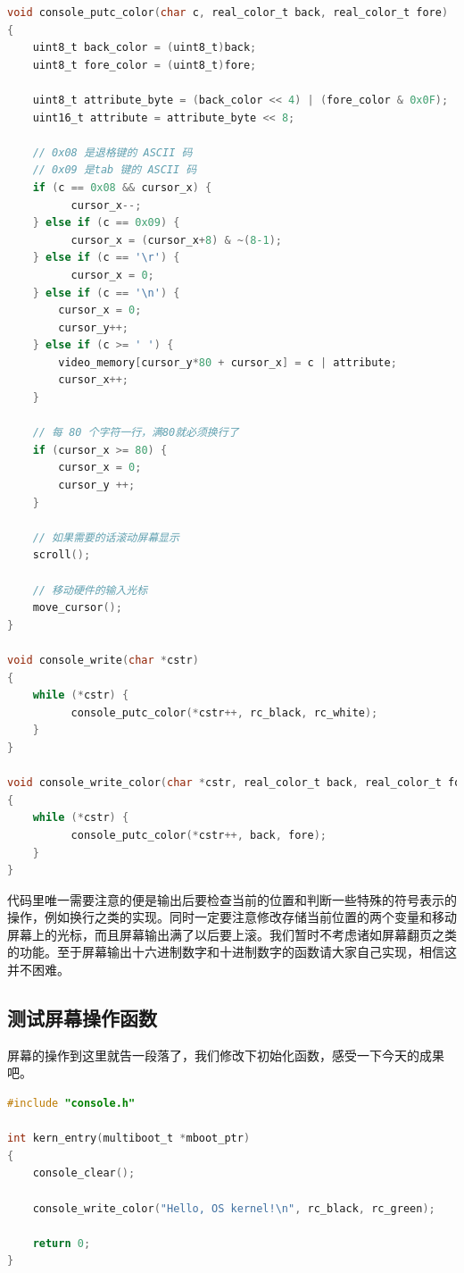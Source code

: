 \begin{lstlisting}[language = C, caption = drivers/console.c]
void console_putc_color(char c, real_color_t back, real_color_t fore)
{
	uint8_t back_color = (uint8_t)back;
	uint8_t fore_color = (uint8_t)fore;

	uint8_t attribute_byte = (back_color << 4) | (fore_color & 0x0F);
	uint16_t attribute = attribute_byte << 8;

	// 0x08 是退格键的 ASCII 码
	// 0x09 是tab 键的 ASCII 码
	if (c == 0x08 && cursor_x) {
	      cursor_x--;
	} else if (c == 0x09) {
	      cursor_x = (cursor_x+8) & ~(8-1);
	} else if (c == '\r') {
	      cursor_x = 0;
	} else if (c == '\n') {
		cursor_x = 0;
		cursor_y++;
	} else if (c >= ' ') {
		video_memory[cursor_y*80 + cursor_x] = c | attribute;
		cursor_x++;
	}

	// 每 80 个字符一行，满80就必须换行了
	if (cursor_x >= 80) {
		cursor_x = 0;
		cursor_y ++;
	}

	// 如果需要的话滚动屏幕显示
	scroll();

	// 移动硬件的输入光标
	move_cursor();
}

void console_write(char *cstr)
{
	while (*cstr) {
	      console_putc_color(*cstr++, rc_black, rc_white);
	}
}

void console_write_color(char *cstr, real_color_t back, real_color_t fore)
{
	while (*cstr) {
	      console_putc_color(*cstr++, back, fore);
	}
}
\end{lstlisting}

\par 代码里唯一需要注意的便是输出后要检查当前的位置和判断一些特殊的符号表示的操作，例如换行之类的实现。同时一定要注意修改存储当前位置的两个变量和移动屏幕上的光标，而且屏幕输出满了以后要上滚。我们暂时不考虑诸如屏幕翻页之类的功能。至于屏幕输出十六进制数字和十进制数字的函数请大家自己实现，相信这并不困难。

\subsection{测试屏幕操作函数}

\par 屏幕的操作到这里就告一段落了，我们修改下初始化函数，感受一下今天的成果吧。

\begin{lstlisting}[language = C, caption = init/entry.c]
#include "console.h"

int kern_entry(multiboot_t *mboot_ptr)
{
	console_clear();

	console_write_color("Hello, OS kernel!\n", rc_black, rc_green);

	return 0;
}
\end{lstlisting}

